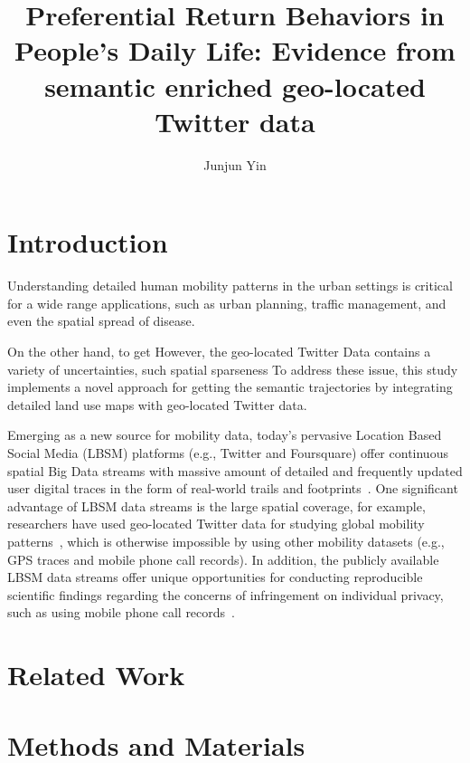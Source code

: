 \documentclass[fleqn,10pt]{wlscirep}
\title{Preferential Return Behaviors in People's Daily Life: Evidence from semantic enriched geo-located Twitter data}
\author[1,2,*]{Junjun  Yin}
\affil[1]{Population Research Institute}
\affil[2]{Social Science Research Institute}
\affil[ ]{The Pennslyvania State University, State College, PA, 16801, USA}
\begin{document}
\flushbottom
\maketitle


\section*{Introduction}
Understanding detailed human mobility patterns in the urban settings is critical for a wide range applications, such as urban planning, traffic management, and even the spatial spread of disease.

On the other hand, to get 
However, the geo-located Twitter Data contains a variety of uncertainties, such spatial sparseness
To address these issue, this study implements a novel approach for getting the semantic trajectories by integrating detailed land use maps with geo-located Twitter data.

Emerging as a new source for mobility data, today's pervasive Location Based Social Media (LBSM) platforms (e.g., Twitter and Foursquare) offer continuous spatial Big Data streams with massive amount of detailed and frequently updated user digital traces in the form of real-world trails and footprints~\cite{thatcher2014}.
One significant advantage of LBSM data streams is the large spatial coverage, for example, researchers have used geo-located Twitter data for studying global mobility patterns~\cite{hawelka2014geo}, which is otherwise impossible by using other mobility datasets (e.g., GPS traces and mobile phone call records). 
In addition, the publicly available LBSM data streams offer unique opportunities for conducting reproducible scientific findings regarding the concerns of infringement on individual privacy, such as using mobile phone call records~\cite{giannotti2008mobility,crampton2014collect,Jurdak2015}.


\section*{Related Work}

\section*{Methods and Materials}
\end{document}
